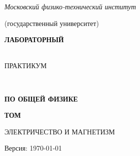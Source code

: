 \setcounter{page}{1}
\thispagestyle{empty}\mbox{}

\noindent
{}%
\hfill
\parbox{90mm}{\centering\itshape Московский физико-технический институт\par
(государственный университет)\par}%
\hfill

\vfill

{\parindent=0pt\centering
{\noindent\bfseries\Huge ЛАБОРАТОРНЫЙ\strut\\ ПРАКТИКУМ\strut\\
}
{\bfseries\LARGE ПО ОБЩЕЙ ФИЗИКЕ }

\vfill

{\bfseries\large ТОМ \tom\strut}

\medskip

{\bfseries\large\strut ЭЛЕКТРИЧЕСТВО И МАГНЕТИЗМ\strut}

}

\newlength{\vva}
\setlength{\vva}{0.3\textwidth}
\newlength{\vvb} 
\setlength{\vvb}{0.46\textwidth}

\vfill


{\hfil Версия: \today}


\vfill

\newpage
